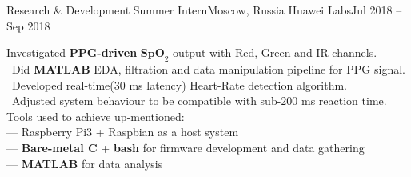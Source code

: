 \resumeSubheading
    {Research \& Development Summer Intern}{Moscow, Russia}
    {Huawei Labs}{Jul 2018 -- Sep 2018}
    \begin{itemize}[leftmargin=0in, label={}]
        \small{\item{
            {Investigated \textbf{PPG-driven} $\mathrm{\textbf{SpO}}_2$ output with Red, Green and IR channels.}\\
            {\textbullet \ Did \textbf{MATLAB} EDA, filtration and data manipulation pipeline for PPG signal.}\\
            {\textbullet \ Developed real-time(30 ms latency) Heart-Rate detection algorithm.}\\
            {\textbullet \ Adjusted system behaviour to be compatible with sub-200 ms reaction time. }\\
            {Tools used to achieve up-mentioned:}\\
            {— Raspberry Pi3 + Raspbian as a host system }\\
            {— \textbf{Bare-metal C} + \textbf{bash} for firmware development and data gathering}\\
            {— \textbf{MATLAB} for data analysis}\\
        }}
    \end{itemize}